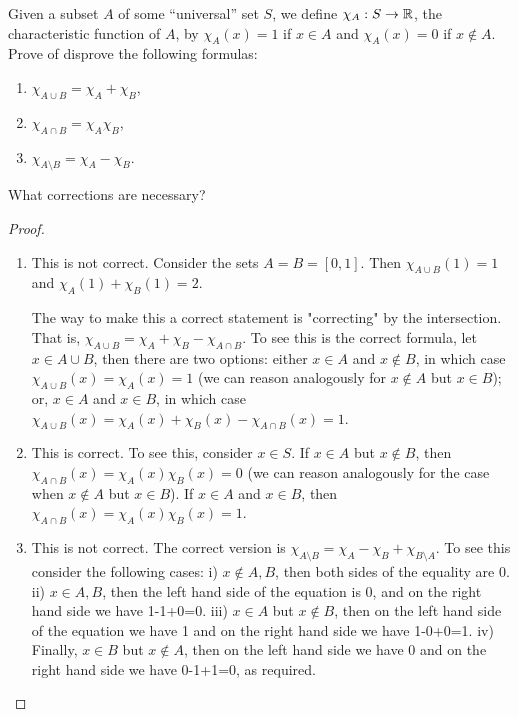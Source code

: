 \begin{exercise}{2}
Given a subset $A$ of some ``universal'' set $S$, we define $\chi_A:S\to\mathbb{R}$, the characteristic function of $A$, by $\chi_A(x)=1$ if $x\in A$ and $\chi_A(x)=0$ if $x\notin A$.
Prove of disprove the following formulas:
\begin{enumerate}
    \item $\chi_{A\cup B}=\chi_A +\chi_B$,
    \item $\chi_{A\cap B}=\chi_A \chi_B$,
    \item $\chi_{A\setminus B}=\chi_A-\chi_B$.
\end{enumerate}
What corrections are necessary?
\end{exercise}
\begin{proof}
\begin{enumerate}
    \item This is not correct.
    Consider the sets $A=B=[0,1]$.
    Then $\chi_{A\cup B}(1)=1$ and $\chi_A(1)+\chi_B(1)=2$.

    The way to make this a correct statement is "correcting" by the intersection.
    That is, $\chi_{A\cup B}=\chi_A+\chi_B-\chi_{A\cap B}$.
    To see this is the correct formula, let $x\in A\cup B$, then there are two options:
    either $x\in A$ and $x\notin B$, in which case $\chi_{A\cup B}(x)=\chi_A(x)=1$ (we can reason analogously for $x\notin A$ but $x\in B$);
    or, $x\in A$ and $x\in B$, in which case $\chi_{A\cup B}(x)=\chi_A(x)+\chi_B(x)-\chi_{A\cap B}(x)=1$.
    \item This is correct.
    To see this, consider $x\in S$.
    If $x\in A$ but $x\notin B$, then $\chi_{A\cap B}(x)=\chi_A(x)\chi_B(x)=0$ (we can reason analogously for the case when $x\notin A$ but $x\in B$).
    If $x\in A$ and $x\in B$, then $\chi_{A\cap B}(x)=\chi_A(x)\chi_B(x)=1$.
    \item This is not correct.
    The correct version is $\chi_{A\setminus B}= \chi_{A}-\chi_{B}+\chi_{B\setminus A}$.
    To see this consider the following cases:
    i) $x\notin A,B$, then both sides of the equality are 0. 
    ii) $x\in A,B$, then the left hand side of the equation is 0, and on the right hand side we have 1-1+0=0.
    iii) $x\in A$ but $x\notin B$, then on the left hand side of the equation we have 1 and on the right hand side we have 1-0+0=1.
    iv) Finally, $x\in B$ but $x\notin A$, then on the left hand side we have 0 and on the right hand side we have 0-1+1=0, as required.
\end{enumerate}
\end{proof} 

